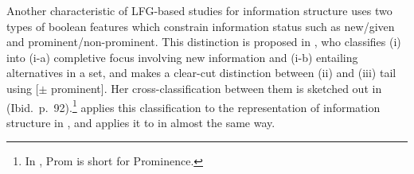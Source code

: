 Another characteristic of LFG-based studies for information structure
uses two types of boolean features which constrain information status
such as new/given and prominent/non-prominent. This distinction is
proposed in \citet{choi:99}, who classifies (i)  into (i-a)
completive focus involving new information and (i-b) 
entailing alternatives in a set, and makes a
clear-cut distinction between (ii)  and (iii) tail using
[\ensuremath{\pm} prominent]. Her cross-classification between them is
sketched out in  (Ibid.\ p.\ 92).\footnote{In
  , Prom is short for Prominence.}
\citeauthor{choi:99} applies this classification to the representation
of information structure in , and \citet{man:07} applies
it to  in almost the same way.




